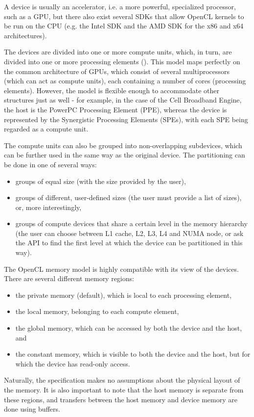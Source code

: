 A device is usually an accelerator, i.e. a more powerful, specialized processor, such as a GPU, but there also exist several SDKs that allow OpenCL kernels to be run on the CPU (e.g. the Intel SDK\cite{http://software.intel.com/en-us/vcsource/tools/opencl} and the AMD SDK\cite{http://developer.amd.com/tools/heterogeneous-computing/amd-accelerated-parallel-processing-app-sdk/} for the x86 and x64 architectures). 

The devices are divided into one or more compute units, which, in turn, are divided into one or more processing elements (). This model maps perfectly on the common architecture of GPUs, which consist of several multiprocessors (which can act as compute units), each containing a number of cores (processing elements). However, the model is flexible enough to accommodate other structures just as well - for example, in the case of the Cell Broadband Engine, the host is the PowerPC Processing Element (PPE), whereas the device is represented by the Synergistic Processing Elements (SPEs), with each SPE being regarded as a compute unit.
\clearpage


The compute units can also be grouped into non-overlapping subdevices, which can be further used in the same way as the original device. The partitioning can be done in one of several ways: 
\begin{itemize}
\item groups of equal size (with the size provided by the user), 
\item groups of different, user-defined sizes (the user must provide a list of sizes), or, more interestingly, 
\item groups of compute devices that share a certain level in the memory hierarchy (the user can choose between L1 cache, L2, L3, L4 and NUMA node, or ask the API to find the first level at which the device can be partitioned in this way).
\end{itemize}

The OpenCL memory model is highly compatible with its view of the devices. There are several different memory regions:
\begin{itemize} 
\item the private memory (default), which is local to each processing element, 
\item the local memory, belonging to each compute element,
\item the global memory, which can be accessed by both the device and the host, and
\item the constant memory, which is visible to both the device and the host, but for which the device has read-only access.
\end{itemize}
Naturally, the specification makes no assumptions about the physical layout of the memory. It is also important to note that the host memory is separate from these regions, and transfers between the host memory and device memory are done using buffers.

